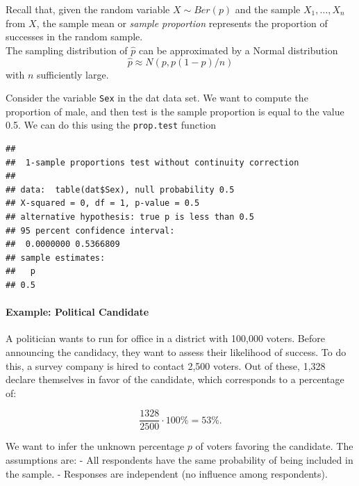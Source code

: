 \documentclass[
]{article}
\newenvironment{Shaded}{\begin{snugshade}}{\end{snugshade}}
\newcommand{\AttributeTok}[1]{\textcolor[rgb]{0.13,0.29,0.53}{#1}}
\newcommand{\FloatTok}[1]{\textcolor[rgb]{0.00,0.00,0.81}{#1}}
\newcommand{\FunctionTok}[1]{\textcolor[rgb]{0.13,0.29,0.53}{\textbf{#1}}}
\newcommand{\NormalTok}[1]{#1}
\newcommand{\SpecialCharTok}[1]{\textcolor[rgb]{0.81,0.36,0.00}{\textbf{#1}}}
\newcommand{\StringTok}[1]{\textcolor[rgb]{0.31,0.60,0.02}{#1}}
\begin{document}
Recall that, given the random variable \(X \sim Ber(p)\) and the sample
\(X_1, \ldots, X_n\) from \(X\), the sample mean or \emph{sample
proportion} represents the proportion of successes in the random
sample.\\
The sampling distribution of \(\hat{p}\) can be approximated by a Normal
distribution \[\hat{p} \approx N(p, p(1-p)/n)\] with \(n\) sufficiently
large.

Consider the variable \texttt{Sex} in the dat data set. We want to
compute the proportion of male, and then test is the sample proportion
is equal to the value 0.5. We can do this using the \texttt{prop.test}
function

\begin{Shaded}
\end{Shaded}

\begin{verbatim}
## 
##  1-sample proportions test without continuity correction
## 
## data:  table(dat$Sex), null probability 0.5
## X-squared = 0, df = 1, p-value = 0.5
## alternative hypothesis: true p is less than 0.5
## 95 percent confidence interval:
##  0.0000000 0.5366809
## sample estimates:
##   p 
## 0.5
\end{verbatim}

\hypertarget{example-political-candidate}{%
\paragraph{Example: Political
Candidate}\label{example-political-candidate}}

A politician wants to run for office in a district with 100,000 voters.
Before announcing the candidacy, they want to assess their likelihood of
success. To do this, a survey company is hired to contact 2,500 voters.
Out of these, 1,328 declare themselves in favor of the candidate, which
corresponds to a percentage of:

\[
\frac{1328}{2500} \cdot 100\% = 53\%.
\]

We want to infer the unknown percentage \(p\) of voters favoring the
candidate. The assumptions are: - All respondents have the same
probability of being included in the sample. - Responses are independent
(no influence among respondents).
\end{document}
